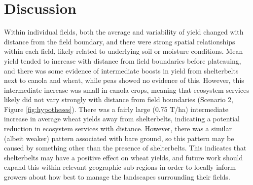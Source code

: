 \documentclass[]{elsarticle} %
\begin{document}
\hypertarget{discussion}{%
\section{Discussion}\label{discussion}}

Within individual fields, both the average and variability of yield changed with distance from the field boundary, and there were strong spatial relationships within each field, likely related to underlying soil or moisture conditions.
Mean yield tended to increase with distance from field boundaries before plateauing, and there was some evidence of intermediate boosts in yield from shelterbelts next to canola and wheat, while peas showed no evidence of this.
However, this intermediate increase was small in canola crops, meaning that ecosystem services likely did not vary strongly with distance from field boundaries (Scenario 2, Figure \ref{fig:hypotheses}).
There was a fairly large (0.75 T/ha) intermediate increase in average wheat yields away from shelterbelts, indicating a potential reduction in ecosystem services with distance.
However, there was a similar (albeit weaker) pattern associated with bare ground, so this pattern may be caused by something other than the presence of shelterbelts.
This indicates that shelterbelts may have a positive effect on wheat yields, and future work should expand this within relevant geographic sub-regions in order to locally inform growers about how best to manage the landscapes surrounding their fields.
\end{document}

